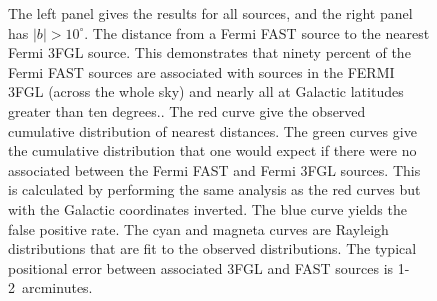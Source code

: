 \documentclass[useAMS,usenatbib]{mn2e}
\begin{document}
\begin{figure}
\caption{The left panel gives the results for all sources, and the right
  panel has $|b|>10^\circ$. The distance from a Fermi FAST source to
  the nearest Fermi 3FGL source.  This demonstrates that ninety
  percent of the Fermi FAST sources are associated with sources in the
  FERMI 3FGL (across the whole sky) and nearly all at Galactic
  latitudes greater than ten degrees..  The red curve give the
  observed cumulative distribution of nearest distances.  The green
  curves give the cumulative distribution that one would expect if
  there were no associated between the Fermi FAST and Fermi 3FGL
  sources.  This is calculated by performing the same analysis as the
  red curves but with the Galactic coordinates inverted.  The blue
  curve yields the false positive rate.  The cyan and magneta curves
  are Rayleigh distributions that are fit to the observed
  distributions.  The typical positional error between associated 3FGL
  and FAST sources is 1-2~arcminutes.  }
\label{fig:corresponances}
\end{figure}
\end{document}
